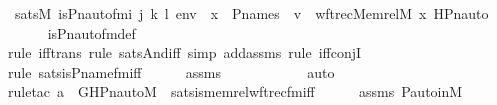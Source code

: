 \begin{isabellebody}
\ {\isachardoublequoteopen}sats{\isacharparenleft}{\kern0pt}M{\isacharcomma}{\kern0pt}\ is{\isacharunderscore}{\kern0pt}Pn{\isacharunderscore}{\kern0pt}auto{\isacharunderscore}{\kern0pt}fm{\isacharparenleft}{\kern0pt}i{\isacharcomma}{\kern0pt}\ j{\isacharcomma}{\kern0pt}\ k{\isacharcomma}{\kern0pt}\ l{\isacharparenright}{\kern0pt}{\isacharcomma}{\kern0pt}\ env{\isacharparenright}{\kern0pt}\ {\isasymlongleftrightarrow}\ x\ {\isasymin}\ P{\isacharunderscore}{\kern0pt}names\ {\isasymand}\ v\ {\isacharequal}{\kern0pt}\ wftrec{\isacharparenleft}{\kern0pt}Memrel{\isacharparenleft}{\kern0pt}M{\isacharparenright}{\kern0pt}{\isacharcircum}{\kern0pt}{\isacharplus}{\kern0pt}{\isacharcomma}{\kern0pt}\ x{\isacharcomma}{\kern0pt}\ HPn{\isacharunderscore}{\kern0pt}auto{\isacharparenleft}{\kern0pt}{\isasympi}{\isacharparenright}{\kern0pt}{\isacharparenright}{\kern0pt}{\isachardoublequoteclose}\isanewline
\ \ \ \ \isamarkupfalse%
\ is{\isacharunderscore}{\kern0pt}Pn{\isacharunderscore}{\kern0pt}auto{\isacharunderscore}{\kern0pt}fm{\isacharunderscore}{\kern0pt}def\ \isanewline
\ \ \ \ \isamarkupfalse%
{\isacharparenleft}{\kern0pt}rule\ iff{\isacharunderscore}{\kern0pt}trans{\isacharcomma}{\kern0pt}\ rule\ sats{\isacharunderscore}{\kern0pt}And{\isacharunderscore}{\kern0pt}iff{\isacharcomma}{\kern0pt}\ simp\ add{\isacharcolon}{\kern0pt}assms{\isacharcomma}{\kern0pt}\ rule\ iff{\isacharunderscore}{\kern0pt}conjI{\isacharparenright}{\kern0pt}\isanewline
\ \ \ \ \ \isamarkupfalse%
{\isacharparenleft}{\kern0pt}rule\ sats{\isacharunderscore}{\kern0pt}is{\isacharunderscore}{\kern0pt}P{\isacharunderscore}{\kern0pt}name{\isacharunderscore}{\kern0pt}fm{\isacharunderscore}{\kern0pt}iff{\isacharparenright}{\kern0pt}\isanewline
\ \ \ \ \isamarkupfalse%
\ assms\ \isanewline
\ \ \ \ \ \ \ \ \ \isamarkupfalse%
\ auto{\isacharbrackleft}{\kern0pt}{}{\isacharbrackright}{\kern0pt}\isanewline
\ \ \ \ \isamarkupfalse%
{\isacharparenleft}{\kern0pt}rule{\isacharunderscore}{\kern0pt}tac\ a{\isacharequal}{\kern0pt}{\isasympi}\ \ G{\isacharequal}{\kern0pt}HPn{\isacharunderscore}{\kern0pt}auto{\isacharunderscore}{\kern0pt}M\ \ sats{\isacharunderscore}{\kern0pt}is{\isacharunderscore}{\kern0pt}memrel{\isacharunderscore}{\kern0pt}wftrec{\isacharunderscore}{\kern0pt}fm{\isacharunderscore}{\kern0pt}iff{\isacharparenright}{\kern0pt}\isanewline
\ \ \ \ \isamarkupfalse%
\ assms\ P{\isacharunderscore}{\kern0pt}auto{\isacharunderscore}{\kern0pt}in{\isacharunderscore}{\kern0pt}M\isanewline

\end{isabellebody}
